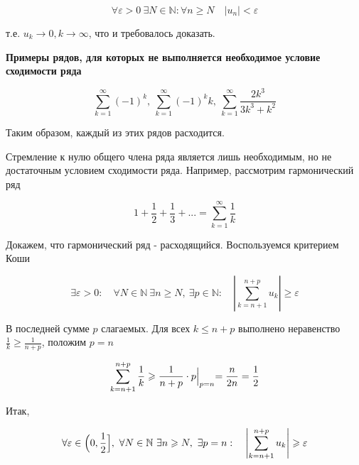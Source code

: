 \begin{equation*}
	\forall\varepsilon > 0 \ \exists N\in\mathbb{N}: \forall n \geqslant N \quad |u_n| < \varepsilon
\end{equation*}

т.е. $u_k \rightarrow 0, k \rightarrow\infty$, что и требовалось доказать.

\textbf{Примеры рядов, для которых не выполняется необходимое условие сходимости ряда}

\begin{equation*}
	\displaystyle\sum_{k = 1}^\infty (-1)^k, \ \displaystyle\sum_{k = 1}^\infty (-1)^kk, \ \displaystyle\sum_{k = 1}^\infty \frac{2k^3}{3k^3 + k^2}
\end{equation*}

Таким образом, каждый из этих рядов расходится.

Стремление к нулю общего члена ряда является лишь необходимым, но не достаточным условием сходимости ряда. Например, рассмотрим гармонический ряд

\begin{equation*}
	1 + \frac{1}{2} + \frac{1}{3} + ... = \displaystyle\sum_{k = 1}^\infty \frac{1}{k}
\end{equation*}

Докажем, что гармонический ряд - расходящийся. Воспользуемся критерием Коши

\begin{equation*}
	\exists\varepsilon > 0: \quad \forall N\in\mathbb{N} \ \exists n \geqslant N, \ \exists p \in\mathbb{N}: \quad \left| \displaystyle\sum_{k = n + 1}^{n + p} u_k \right| \geqslant \varepsilon
\end{equation*}

В последней сумме $p$ слагаемых. Для всех $k \leqslant n + p$ выполнено неравенство $\frac{1}{k} \geqslant \frac{1}{n + p}$, положим $p = n$

\begin{equation*}
	\displaystyle\sum_{k = n + 1}^{n + p} \frac{1}{k} \geqslant \frac{1}{n + p} \cdot p \Bigl|_{p = n} = \frac{n}{2n} = \frac{1}{2}
\end{equation*}

Итак,

\begin{equation*}
	\forall\varepsilon \in \Bigl( 0, \frac{1}{2} \Bigr],\ \forall N \in \mathbb{N} \ \exists n\geqslant N, \ \exists p = n: \quad \left| \displaystyle\sum_{k = n + 1}^{n + p} u_k \right| \geqslant \varepsilon
\end{equation*}

